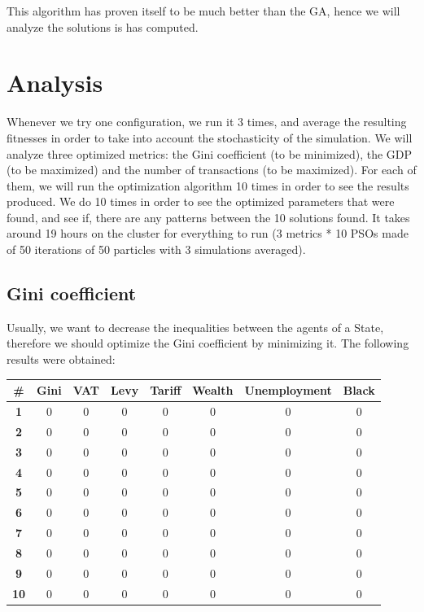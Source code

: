     This algorithm has proven itself to be much better than the GA, hence we will analyze the solutions is has computed. 

\section{Analysis}
    Whenever we try one configuration, we run it 3 times, and average the resulting fitnesses in order to take into account the stochasticity of the simulation. We will analyze three optimized metrics: the Gini coefficient (to be minimized), the GDP (to be maximized) and the number of transactions (to be maximized). For each of them, we will run the optimization algorithm 10 times in order to see the results produced. We do 10 times in order to see the optimized parameters that were found, and see if, there are any patterns between the 10 solutions found. It takes around 19 hours on the cluster for everything to run (3 metrics * 10 PSOs made of 50 iterations of 50 particles with 3 simulations averaged).

    \subsection{Gini coefficient}

        Usually, we want to decrease the inequalities between the agents of a State, therefore we should optimize the Gini coefficient by minimizing it. The following results were obtained:
    
        \begin{table}[H]
        \centering
        \begin{tabular}{|c|c|c|c|c|c|c|c|}
            \hline
            \textbf{\#} & \textbf{Gini}  & \textbf{VAT} & \textbf{Levy} & \textbf{Tariff} & \textbf{Wealth} & \textbf{Unemployment} & \textbf{Black} \\ \hline
            \textbf{1} & 0 & 0 & 0 & 0 & 0 & 0 & 0 \\ \hline
            \textbf{2} & 0 & 0 & 0 & 0 & 0 & 0 & 0 \\ \hline
            \textbf{3} & 0 & 0 & 0 & 0 & 0 & 0 & 0 \\ \hline
            \textbf{4} & 0 & 0 & 0 & 0 & 0 & 0 & 0 \\ \hline
            \textbf{5} & 0 & 0 & 0 & 0 & 0 & 0 & 0 \\ \hline
            \textbf{6} & 0 & 0 & 0 & 0 & 0 & 0 & 0 \\ \hline
            \textbf{7} & 0 & 0 & 0 & 0 & 0 & 0 & 0 \\ \hline
            \textbf{8} & 0 & 0 & 0 & 0 & 0 & 0 & 0 \\ \hline
            \textbf{9} & 0 & 0 & 0 & 0 & 0 & 0 & 0 \\ \hline
            \textbf{10} & 0 & 0 & 0 & 0 & 0 & 0 & 0 \\ \hline
        \end{tabular}
        \end{table}

